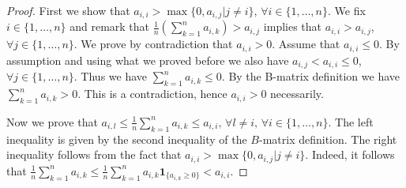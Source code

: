 \documentclass[10pt,a4paper]{amsart}
\begin{document}
\begin{proof}{}
    First we show that $a_{i,i} > \max\{0,a_{i,j}|j\neq i\} \text{, } \forall i \in \{1,\dots,n\}$. We fix $i\in\{1,\dots,n\}$ and remark that $\frac{1}{n}\left(\sum_{k=1}^{n}a_{i,k}\right)>a_{i,j}$ implies that $a_{i,i}>a_{i,j}$, $\forall j \in \{1,\dots,n\}$. We prove by contradiction that $a_{i,i}>0$. Assume that $a_{i,i}\le0$. By assumption and using what we proved before we also have $a_{i,j}<a_{i,i}\le 0$, $\forall j \in \{1,\dots,n\}$. Thus we have $\sum_{k=1}^{n}a_{i,k}\le0$. By the B-matrix definition we have $\sum_{k=1}^{n}a_{i,k}>0$. This is a contradiction, hence $a_{i,i}>0$ necessarily. 

    Now we prove that $a_{i,l} \le \frac{1}{n}\sum_{k=1}^{n}a_{i,k} \le a_{i,i} \text{, } \forall l\neq i\text{, }\forall i \in \{1,\dots,n\}$. The left inequality is given by the second inequality of the $B$-matrix definition. The right inequality follows from the fact that $a_{i,i} > \max\{0,a_{i,j}|j\neq i\}$. Indeed, it follows that $\frac{1}{n}\sum_{k=1}^{n}a_{i,k}\le\frac{1}{n}\sum_{k=1}^{n}a_{i,k}\pmb{1}_{\{a_{i,k}\ge0\}}<a_{i,i}.$
    
\end{proof}
\end{document}
